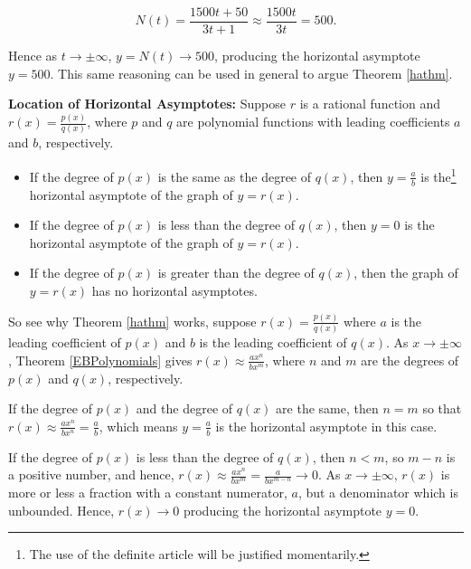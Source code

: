 \begin{ex}
 \[ N(t) = \dfrac{1500t + 50}{3t+1} \approx \dfrac{1500t}{3t} = 500.\]
 
Hence as $t \rightarrow \pm \infty$, $y = N(t) \rightarrow 500$, producing the horizontal asymptote $y = 500$.  This same reasoning can be used in general to argue Theorem \ref{hathm}.

\begin{mthm}

\textbf{Location of Horizontal Asymptotes:}
\label{hathm} Suppose $r$ is a rational function and $r(x) = \frac{p(x)}{q(x)}$, where $p$ and $q$ are polynomial functions with leading coefficients $a$ and $b$, respectively. 


\begin{itemize}

\item  If the degree of $p(x)$ is the same as the degree of $q(x)$, then $y=\frac{a}{b}$ is the\footnote{The use of the definite article will be justified momentarily.} horizontal asymptote of the graph of $y=r(x)$.

\item  If the degree of $p(x)$ is less than the degree of $q(x)$, then $y=0$ is the horizontal asymptote of the graph of $y=r(x)$.

\item  If the degree of $p(x)$ is greater than the degree of $q(x)$, then the graph of $y=r(x)$ has no horizontal asymptotes.


\end{itemize}
\end{mthm}

\end{ex}

So see why Theorem \ref{hathm} works, suppose $r(x) = \frac{p(x)}{q(x)}$ where $a$ is the leading coefficient of $p(x)$ and $b$ is the leading coefficient of $q(x)$. As $x \rightarrow \pm \infty$,  Theorem \ref{EBPolynomials} gives $r(x) \approx \frac{ax^n}{bx^m}$, where $n$ and $m$ are the degrees of $p(x)$ and $q(x)$, respectively. 

If the degree of $p(x)$ and the degree of $q(x)$ are the same, then $n=m$ so that $r(x) \approx \frac{ax^n}{bx^n} = \frac{a}{b}$, which means $y=\frac{a}{b}$ is the horizontal asymptote in this case.  

If the degree of $p(x)$ is less than the degree of $q(x)$, then $n < m$, so $m-n$ is a positive number, and hence, $r(x) \approx  \frac{ax^n}{bx^m}  = \frac{a}{bx^{m-n}} \rightarrow 0$.   As $x \rightarrow \pm \infty$, $r(x)$ is more or less a fraction with a constant numerator, $a$, but a denominator which is unbounded. Hence, $r(x) \rightarrow 0$ producing the horizontal asymptote $y = 0$.   

